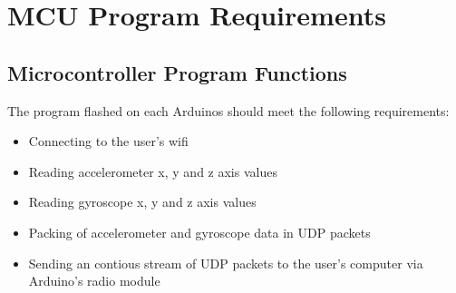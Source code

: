 \newpage
\section{MCU Program Requirements}

\subsection{Microcontroller Program Functions}

\begin{description}
	\item The program flashed on each Arduinos should meet the following requirements:
\end{description}

\begin{itemize}
	\item Connecting to the user's wifi
	\item Reading accelerometer x, y and z axis values
	\item Reading gyroscope x, y and z axis values
	\item Packing of accelerometer and gyroscope data in UDP packets
	\item Sending an contious stream of UDP packets to the user's computer via Arduino's radio module
\end{itemize}
